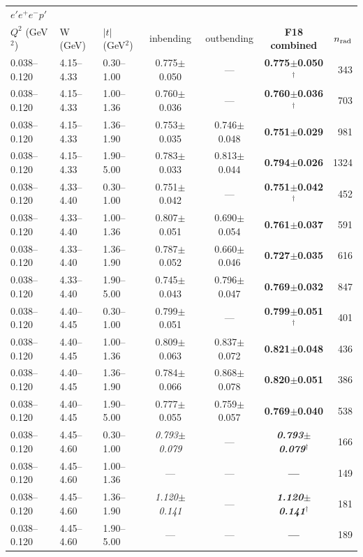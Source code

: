 \medskip

\begin{tabular}{lllcccr}\toprule
\multicolumn{7}{l}{$e'e^+e^-p'$}\\
$Q^2$ (GeV$^2$) & W (GeV) & $|t|$ (GeV$^2$) & inbending & outbending & \textbf{F18 combined} & $n_{\rm rad}$ \\\midrule
0.038--0.120 & 4.15--4.33 & 0.30--1.00 & 0.775$\pm$0.050 & --- & \textbf{0.775$\pm$0.050$^\dagger$} & 343 \\
0.038--0.120 & 4.15--4.33 & 1.00--1.36 & 0.760$\pm$0.036 & --- & \textbf{0.760$\pm$0.036$^\dagger$} & 703 \\
0.038--0.120 & 4.15--4.33 & 1.36--1.90 & 0.753$\pm$0.035 & 0.746$\pm$0.048 & \textbf{0.751$\pm$0.029} & 981 \\
0.038--0.120 & 4.15--4.33 & 1.90--5.00 & 0.783$\pm$0.033 & 0.813$\pm$0.044 & \textbf{0.794$\pm$0.026} & 1324 \\
0.038--0.120 & 4.33--4.40 & 0.30--1.00 & 0.751$\pm$0.042 & --- & \textbf{0.751$\pm$0.042$^\dagger$} & 452 \\
0.038--0.120 & 4.33--4.40 & 1.00--1.36 & 0.807$\pm$0.051 & 0.690$\pm$0.054 & \textbf{0.761$\pm$0.037} & 591 \\
0.038--0.120 & 4.33--4.40 & 1.36--1.90 & 0.787$\pm$0.052 & 0.660$\pm$0.046 & \textbf{0.727$\pm$0.035} & 616 \\
0.038--0.120 & 4.33--4.40 & 1.90--5.00 & 0.745$\pm$0.043 & 0.796$\pm$0.047 & \textbf{0.769$\pm$0.032} & 847 \\
0.038--0.120 & 4.40--4.45 & 0.30--1.00 & 0.799$\pm$0.051 & --- & \textbf{0.799$\pm$0.051$^\dagger$} & 401 \\
0.038--0.120 & 4.40--4.45 & 1.00--1.36 & 0.809$\pm$0.063 & 0.837$\pm$0.072 & \textbf{0.821$\pm$0.048} & 436 \\
0.038--0.120 & 4.40--4.45 & 1.36--1.90 & 0.784$\pm$0.066 & 0.868$\pm$0.078 & \textbf{0.820$\pm$0.051} & 386 \\
0.038--0.120 & 4.40--4.45 & 1.90--5.00 & 0.777$\pm$0.055 & 0.759$\pm$0.057 & \textbf{0.769$\pm$0.040} & 538 \\
0.038--0.120 & 4.45--4.60 & 0.30--1.00 & \textit{0.793$\pm$0.079} & --- & \textbf{\textit{0.793$\pm$0.079}$^\dagger$} & 166 \\
0.038--0.120 & 4.45--4.60 & 1.00--1.36 & --- & --- & \textbf{---} & 149 \\
0.038--0.120 & 4.45--4.60 & 1.36--1.90 & \textit{1.120$\pm$0.141} & --- & \textbf{\textit{1.120$\pm$0.141}$^\dagger$} & 181 \\
0.038--0.120 & 4.45--4.60 & 1.90--5.00 & --- & --- & \textbf{---} & 189 \\
\bottomrule\end{tabular}

\medskip

